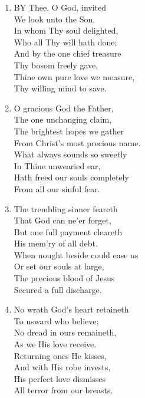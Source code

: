 \begin{enumerate}
    \item BY Thee, O God, invited \\
        We look unto the Son, \\
        In whom Thy soul delighted, \\
        Who all Thy will hath done; \\
        And by the one chief treasure \\
        Thy bosom freely gave, \\
        Thine own pure love we measure, \\
        Thy willing mind to save.

    \item O gracious God the Father, \\
        The one unchanging claim, \\
        The brightest hopes we gather \\
        From Christ's most precious name. \\
        What always sounds so sweetly \\
        In Thine unwearied ear, \\
        Hath freed our souls completely \\
        From all our sinful fear.

    \item The trembling sinner feareth \\
        That God can ne'er forget, \\
        But one full payment cleareth \\
        His mem'ry of all debt. \\
        When nought beside could ease us \\
        Or set our souls at large, \\
        The precious blood of Jesus \\
        Secured a full discharge.

    \item No wrath God's heart retaineth \\
        To usward who believe; \\
        No dread in ours remaineth, \\
        As we His love receive. \\
        Returning ones He kisses, \\
        And with His robe invests, \\
        His perfect love dismisses \\
        All terror from our breasts.

\end{enumerate}

